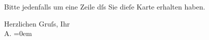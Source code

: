 \pstart
           Bitte jedenfalls um eine Zeile dſs Sie
      dieſe Karte erhalten haben.\pend
           
\pstart
           Herzlichen Gruſs, Ihr{\\[\baselineskip]}\spacefill\mbox{A.}\pend
           \leftskip=0em{}\endnumbering{}
\begin{anhang}
\end{anhang}\newcommand{\dateiname}{L04053}\newcommand{\titel}{Arthur Schnitzler an Gustav Schwarzkopf, [24. oder 25]. 8. 1904}\newcommand{\editorInnen}{Herausgegeben von Jahnke, SelmaMüller, Martin Anton}
